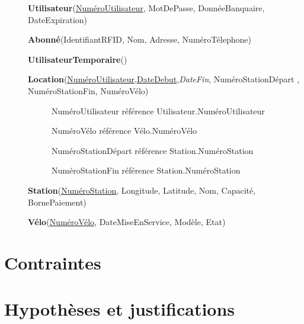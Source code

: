 \documentclass[a4paper,10pt]{report}
\begin{document}
\begin{description}
\item[] \textbf{Utilisateur}(\underline{NuméroUtilisateur}, MotDePasse, DonnéeBanquaire, DateExpiration)

\item[] \textbf{Abonné}(IdentifiantRFID, Nom, Adresse, NuméroTélephone)

\item[] \textbf{UtilisateurTemporaire}()

\item[] \textbf{Location}(\underline{NuméroUtilisateur,DateDebut},\textit{DateFin}, NuméroStationDépart , NuméroStationFin, NuméroVélo) %
	\begin{description}
	\item[] NuméroUtilisateur référence Utilisateur.NuméroUtilisateur
	\item[] NuméroVélo référence Vélo.NuméroVélo
	\item[] NuméroStationDépart référence Station.NuméroStation
	\item[] NuméroStationFin référence Station.NuméroStation
	\end{description}
	
\item[] \textbf{Station}(\underline{NuméroStation}, Longitude, Latitude, Nom, Capacité, BornePaiement)

 \item[] \textbf{Vélo}(\underline{NuméroVélo}, DateMiseEnService, Modèle, Etat)

\end{description}

\section{Contraintes}
\section{Hypothèses et justifications}
\end{document}
